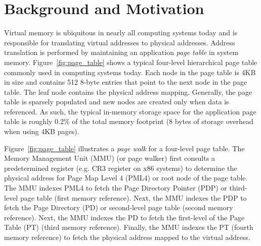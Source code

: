
\section{Background and Motivation} 
\label{sec:background}

\noindent Virtual memory is ubiquitous in nearly all computing systems
today and is responsible for translating virtual addresses to physical
addresses. Address translation is performed by maintaining an
application {\em page table} in system memory.
Figure~\ref{fig:page_table} shows a typical four-level hierarchical
page table commonly used in computing systems today. Each node in the
page table is 4KB in size and contains 512 8-byte entries that point
to the next node in the page table. The leaf node contains the
physical address mapping. Generally, the page table is sparsely
populated and new nodes are created only when data is referenced. As
such, the typical in-memory storage space for the application page
table is roughly 0.2\% of the total memory footprint (8 bytes of
storage overhead when using 4KB pages).


Figure~\ref{fig:page_table} illustrates a {\em page walk} for a
four-level page table. The Memory Management Unit (MMU) (or page
walker) first consults a predetermined register (e.g. CR3 register on
x86 systems) to determine the physical address for Page Map Level 4
(PML4) or root node of the page table. The MMU indexes PML4 to fetch
the Page Directory Pointer (PDP) or third-level page table (first
memory reference). Next, the MMU indexes the PDP to fetch the Page
Directory (PD) or second-level page table (second memory reference).
Next, the MMU indexes the PD to fetch the first-level of the Page
Table (PT) (third memory reference). Finally, the MMU indexes the PT
(fourth memory reference) to fetch the physical address mapped to the
virtual address.


% 
% 

